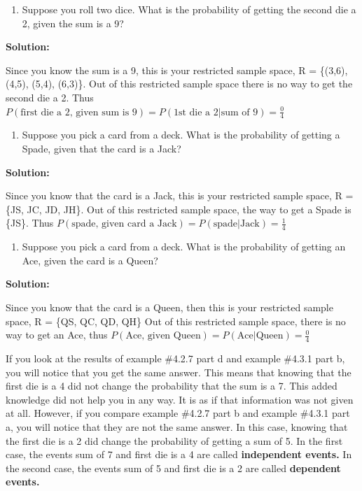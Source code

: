 \documentclass[]{book}
\providecommand{\tightlist}{%
  \setlength{\itemsep}{0pt}\setlength{\parskip}{0pt}}
\begin{document}
\begin{enumerate}
\def\labelenumi{\alph{enumi}.}
\setcounter{enumi}{2}
\tightlist
\item
  Suppose you roll two dice. What is the probability of getting the
  second die a 2, given the sum is a 9?
\end{enumerate}

\textbf{Solution:}

Since you know the sum is a 9, this is your restricted sample space, R = \{(3,6), (4,5), (5,4), (6,3)\}. Out of this restricted sample space there is no way to get the second die a 2. Thus \(P(\text{first die a 2, given sum is 9})=P(\text{1st die a 2}|\text{sum of 9})=\frac{0}{4}\)

\begin{enumerate}
\def\labelenumi{\alph{enumi}.}
\setcounter{enumi}{3}
\tightlist
\item
  Suppose you pick a card from a deck. What is the probability of
  getting a Spade, given that the card is a Jack?
\end{enumerate}

\textbf{Solution:}

Since you know that the card is a Jack, this is your restricted sample space, R = \{JS, JC, JD, JH\}. Out of this restricted sample space, the way to get a Spade is \{JS\}. Thus \(P(\text{spade, given card a Jack})=P(\text{spade}|\text{Jack})=\frac{1}{4}\)

\begin{enumerate}
\def\labelenumi{\alph{enumi}.}
\setcounter{enumi}{4}
\tightlist
\item
  Suppose you pick a card from a deck. What is the probability of
  getting an Ace, given the card is a Queen?
\end{enumerate}

\textbf{Solution:}

Since you know that the card is a Queen, then this is your restricted sample space, R = \{QS, QC, QD, QH\} Out of this restricted sample space, there is no way to get an Ace, thus \(P(\text{Ace, given Queen})=P(\text{Ace}|\text{Queen})=\frac{0}{4}\)

If you look at the results of example \#4.2.7 part d and example \#4.3.1 part b, you will notice that you get the same answer. This means that knowing that the first die is a 4 did not change the probability that the sum is a 7. This added knowledge did not help you in any way. It is as if that information was not given at all. However, if you compare example \#4.2.7 part b and example \#4.3.1 part a, you will notice that they are not the same answer. In this case, knowing that the first die is a 2 did change the probability of getting a sum of 5. In the first case, the events sum of 7 and first die is a 4 are called \textbf{independent events.} In the second case, the events sum of 5 and first die is a 2 are called \textbf{dependent events.}
\end{document}
